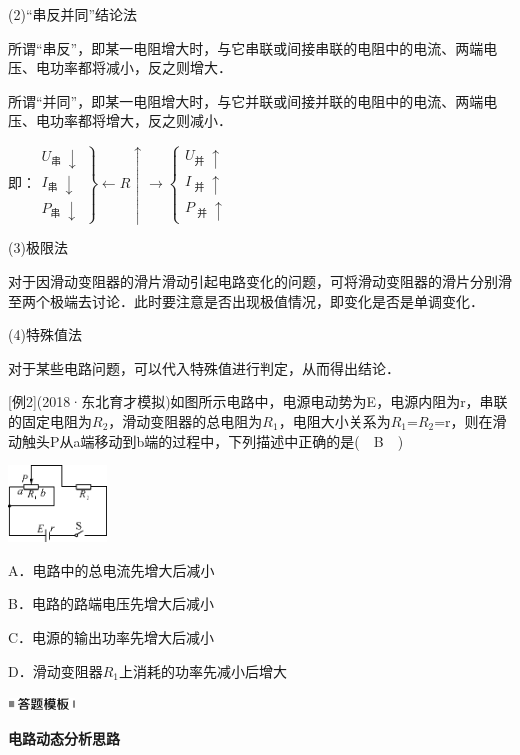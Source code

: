 (2)``串反并同''结论法

所谓``串反''，即某一电阻增大时，与它串联或间接串联的电阻中的电流、两端电压、电功率都将减小，反之则增大．

所谓``并同''，即某一电阻增大时，与它并联或间接并联的电阻中的电流、两端电压、电功率都将增大，反之则减小．

即：$\left.\begin{array}{l}U_{\text {串 }} \downarrow \\ I_{\text {串 }} \downarrow \\ P_{\text {串 }}\downarrow\end{array}\right\} \leftarrow R \uparrow \rightarrow\left\{\begin{array}{l}U_{\text {并 }} \uparrow \\ I_ \text { 并 } \uparrow \\ P_\text { 并 }{\uparrow}\end{array}\right.$

(3)极限法

对于因滑动变阻器的滑片滑动引起电路变化的问题，可将滑动变阻器的滑片分别滑至两个极端去讨论．此时要注意是否出现极值情况，即变化是否是单调变化．

(4)特殊值法

对于某些电路问题，可以代入特殊值进行判定，从而得出结论．

{[}例2{]}(2018·东北育才模拟)如图所示电路中，电源电动势为E，电源内阻为r，串联的固定电阻为$R_2$，滑动变阻器的总电阻为$R_1$，电阻大小关系为$R_1$=$R_2$=r，则在滑动触头P从a端移动到b端的过程中，下列描述中正确的是(　B　)

\begin{center}\includegraphics[width=1.02847in,height=0.80208in]{media/image322.png}\end{center}

A．电路中的总电流先增大后减小

B．电路的路端电压先增大后减小

C．电源的输出功率先增大后减小

D．滑动变阻器$R_1$上消耗的功率先减小后增大

\begin{center}\includegraphics[width=0.70764in,height=0.12292in]{media/image25.png}\end{center}
\begin{center}
	\textbf{电路动态分析思路}
\end{center}

